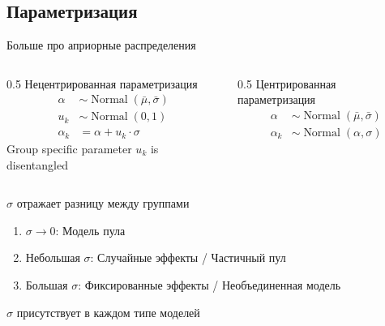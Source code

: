 \documentclass{beamer}
\begin{document}
\subsection{Параметризация}
\begin{frame}{Больше про априорные распределения}
\begin{columns}[t]
\begin{column}{0.5\linewidth}
Нецентрированная параметризация
\begin{align*}
    \alpha &\sim \operatorname{Normal}(\bar\mu, \bar\sigma)\\
    u_k &\sim \operatorname{Normal}(0, 1)\\
    \alpha_k & = \alpha + u_k \cdot \sigma
\end{align*}
Group specific parameter $u_k$ is disentangled
\end{column}
\begin{column}{0.5\linewidth}
Центрированная параметризация
\begin{align*}
    \alpha &\sim \operatorname{Normal}(\bar\mu, \bar\sigma)\\
    \alpha_k &\sim \operatorname{Normal}(\alpha, \sigma)
\end{align*}
\end{column}
\end{columns}
\vspace{1em}
$\sigma$ отражает разницу между группами
\begin{enumerate}
    \item $\sigma \to 0$: Модель пула
    \item Небольшая $\sigma$: Случайные эффекты / Частичный пул
    \item Большая $\sigma$: Фиксированные эффекты / Необъединенная модель
\end{enumerate}
$\sigma$ присутствует в каждом типе моделей
\end{frame}
\end{document}
